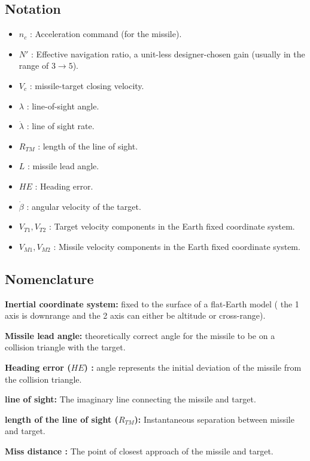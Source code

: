 \subsection*{Notation}
\begin{itemize}
	\item $n_c$ : Acceleration command (for the missile).
	\item $N'$ : Effective navigation ratio, a unit-less designer-chosen gain (usually in the range of $3\to5$).
	\item $V_c$ : missile-target closing velocity.
	\item $\lambda$ : line-of-sight angle.
	\item $\dot{\lambda}$ : line of sight rate.
	\item $R_{TM}$ : length of the line of sight.
	\item $L$ : missile lead angle.
	\item $HE$ : Heading error.
	\item $\dot{\beta}$ : angular velocity of the target.
	\item $V_{T1},V_{T2}$ : Target velocity components in the Earth fixed coordinate system.
	\item $V_{M1},V_{M2}$ : Missile velocity components in the Earth fixed coordinate system.
\end{itemize}
\subsection*{Nomenclature}

\textbf{Inertial coordinate system:} fixed to the surface of a flat-Earth model ( the 1 axis is downrange and the 2 axis can either be altitude or cross-range).

\textbf{Missile lead angle:} theoretically correct angle
for the missile to be on a collision triangle with the target.

\textbf{Heading error ($HE$) :} angle represents the initial deviation of the missile from the collision triangle.

\textbf{line of sight:} The imaginary line connecting the missile and target.

\textbf{length of the line of sight ($R_{TM}$):} Instantaneous separation between missile and target.

\textbf{Miss distance :} The point of closest approach of the missile and target.

